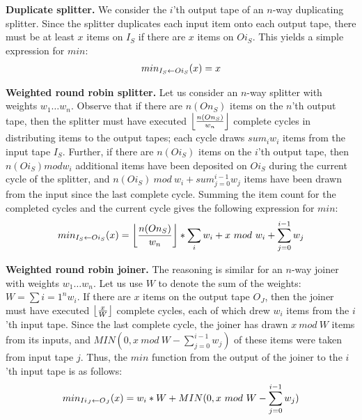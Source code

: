 {\bf Duplicate splitter.}  We consider the $i$'th output tape of an
$n$-way duplicating splitter.  Since the splitter duplicates each
input item onto each output tape, there must be at least $x$ items on
$I_S$ if there are $x$ items on $Oi_S$.  This yields a simple
expression for $min$:
\begin{align*}
min_{I_S \leftarrow Oi_S}(x) = x
\end{align*}

{\bf Weighted round robin splitter.}  Let us consider an $n$-way
splitter with weights $w_1 \dots w_n$.  Observe that if there are
$n(On_S)$ items on the $n$'th output tape, then the splitter must have
executed $\left\lfloor\frac{n(On_S)}{w_n}\right\rfloor$ complete cycles in distributing items
to the output tapes; each cycle draws $sum_{i}{w_i}$ items from the
input tape $I_S$.  Further, if there are $n(Oi_S)$ items on the $i$'th
output tape, then $n(Oi_S) mod w_i$ additional items have been
deposited on $Oi_S$ during the current cycle of the splitter, and
$n(Oi_S)~mod~w_i + sum_{j=0}^{i-1}{w_j}$ items have been drawn from
the input since the last complete cycle.  Summing the item count for
the completed cycles and the current cycle gives the following
expression for $min$:
\begin{align*}
min_{I_S \leftarrow Oi_S}(x) = \left\lfloor\frac{n(On_S)}{w_n}\right\rfloor * \sum_{i}{w_i} + x~mod~w_i +
\sum_{j=0}^{i-1}{w_j}
\end{align*}

{\bf Weighted round robin joiner.}  The reasoning is similar for an
$n$-way joiner with weights $w_1 \dots w_n$.  Let us use $W$ to denote
the sum of the weights: $W = \sum{i=1}^{n}{w_i}$.  If there are $x$
items on the output tape $O_J$, then the joiner must have executed
$\left\lfloor\frac{x}{W}\right\rfloor$ complete cycles, each of which drew $w_i$ items from
the $i$'th input tape.  Since the last complete cycle, the joiner has
drawn $x~mod~W$ items from its inputs, and $MIN(0, x~mod~W -
\sum_{j=0}^{i-1}{w_j})$ of these items were taken from input tape $j$.
Thus, the $min$ function from the output of the joiner to the $i$'th
input tape is as follows:
\begin{align*}
min_{Ii_J \leftarrow O_J}(x) = w_i * W + MIN(0, x~mod~W - \sum_{j=0}^{i-1}{w_j})
\end{align*}

